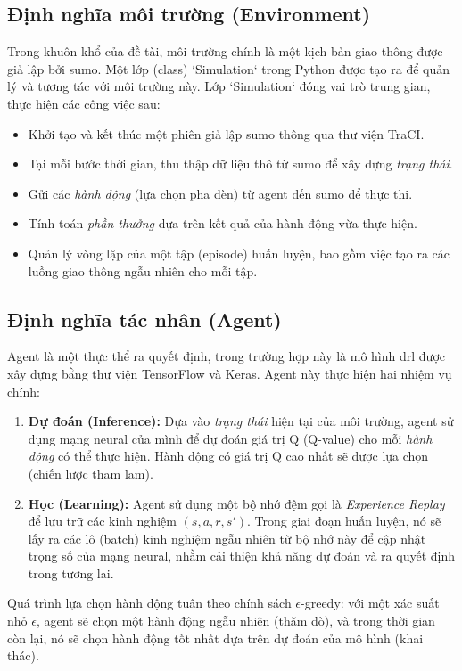 \subsection{Định nghĩa môi trường (Environment)}
Trong khuôn khổ của đề tài, môi trường chính là một kịch bản giao thông được giả lập bởi \ac{sumo}. Một lớp (class) `Simulation` trong Python được tạo ra để quản lý và tương tác với môi trường này. Lớp `Simulation` đóng vai trò trung gian, thực
hiện các công việc sau:
\begin{itemize}
    \item Khởi tạo và kết thúc một phiên giả lập \ac{sumo} thông qua thư viện
    TraCI.

    \item Tại mỗi bước thời gian, thu thập dữ liệu thô từ \ac{sumo} để xây dựng \textit{trạng
    thái}.

    \item Gửi các \textit{hành động} (lựa chọn pha đèn) từ agent đến \ac{sumo} để
    thực thi.

    \item Tính toán \textit{phần thưởng} dựa trên kết quả của hành động vừa thực
    hiện.

    \item Quản lý vòng lặp của một tập (episode) huấn luyện, bao gồm việc tạo ra
    các luồng giao thông ngẫu nhiên cho mỗi tập.
\end{itemize}

\subsection{Định nghĩa tác nhân (Agent)}
Agent là một thực thể ra quyết định, trong trường hợp này là mô hình \ac{drl} được
xây dựng bằng thư viện TensorFlow và Keras. Agent này thực hiện hai nhiệm vụ
chính:
\begin{enumerate}
    \item \textbf{Dự đoán (Inference):} Dựa vào \textit{trạng thái} hiện tại của
    môi trường, agent sử dụng mạng neural của mình để dự đoán giá trị Q (Q-value)
    cho mỗi \textit{hành động} có thể thực hiện. Hành động có giá trị Q cao
    nhất sẽ được lựa chọn (chiến lược tham lam).

    \item \textbf{Học (Learning):} Agent sử dụng một bộ nhớ đệm gọi là \textit{Experience
    Replay} để lưu trữ các kinh nghiệm $(s, a, r, s')$. Trong giai đoạn huấn
    luyện, nó sẽ lấy ra các lô (batch) kinh nghiệm ngẫu nhiên từ bộ nhớ này để
    cập nhật trọng số của mạng neural, nhằm cải thiện khả năng dự đoán và ra
    quyết định trong tương lai.
\end{enumerate}
Quá trình lựa chọn hành động tuân theo chính sách $\epsilon$-greedy: với một xác
suất nhỏ $\epsilon$, agent sẽ chọn một hành động ngẫu nhiên (thăm dò), và trong
thời gian còn lại, nó sẽ chọn hành động tốt nhất dựa trên dự đoán của mô hình (khai
thác).


